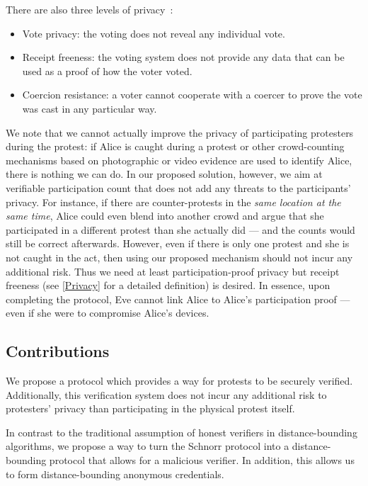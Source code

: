 There are also three levels of 
privacy~\cite{VerifyingPrivacyPropertiesOfVotingProtocols}:
\begin{itemize}
  \item\label{VotePrivacy} Vote privacy: the voting does not reveal any 
    individual vote.
  \item\label{ReceiptFreeness} Receipt freeness: the voting system does not 
    provide any data that can be used as a proof of how the voter voted.
  \item\label{CoercionResistance} Coercion resistance: a voter cannot cooperate 
    with a coercer to prove the vote was cast in any particular way.
\end{itemize}
We note that we cannot actually improve the privacy of participating protesters during 
the protest: if Alice is caught during a protest or other
crowd-counting mechanisms based on photographic or video evidence are
used to identify Alice, there is nothing we
can do. In our proposed solution, however, we aim at verifiable
participation count that does not add any threats to the participants'
privacy. For instance, if there are counter-protests in the \emph{same location at the same 
  time}, Alice could even blend into another crowd and argue that she participated in 
a different protest than she actually did --- and the counts would still be 
correct afterwards.
However, even if there is only one protest and she is not caught in the act, 
then using our proposed mechanism should not incur any additional risk.
Thus we need at least participation-proof privacy but receipt freeness (see 
\cref{Privacy} for a detailed definition) is desired.
In essence, upon completing the protocol, Eve cannot link Alice to Alice's 
participation proof --- even if she were to compromise Alice's
devices.

\subsection{Contributions}

We propose a protocol which provides a way for protests to be securely verified.
Additionally, this verification system does not incur any additional risk to 
protesters' privacy than participating in the physical protest itself.

In contrast to the traditional assumption of honest verifiers in
distance-bounding algorithms, we propose a way to turn the Schnorr
protocol into a distance-bounding protocol that allows for a malicious
verifier. In addition, this allows us to form distance-bounding
anonymous credentials.

